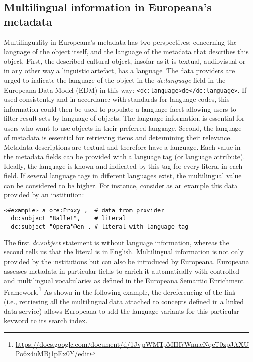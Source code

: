 \subsection{Multilingual information in Europeana's metadata}
\label{sec:multilingualinfo}

Multilinguality in Europeana's metadata has two perspectives: concerning the language of the object itself, and the language of the metadata that describes this object. First, the described cultural object, insofar as it is textual, audiovisual or in any other way a linguistic artefact, has a language. The data providers are urged to indicate the language of the object in the \textit{dc:language} field in the Europeana Data Model (EDM) in this way: \texttt{<dc:language>de</dc:language>}. If used consistently and in accordance with standards for language codes, this information could then be used to populate a language facet allowing users to filter result-sets by language of objects. The language information is essential for users who want to use objects in their preferred language. 
Second, the language of metadata is essential for retrieving items and determining their relevance. Metadata descriptions are textual and therefore have a language. Each value in the metadata fields can be provided with a language tag (or language attribute). Ideally, the language is known and indicated by this tag for every literal in each field. If several language tags in different languages exist, the multilingual value can be considered to be higher. For instance, consider as an example this data provided by an institution:

\begingroup
   \fontsize{8pt}{10pt}\selectfont
\begin{verbatim}
<#example> a ore:Proxy ;  # data from provider
  dc:subject "Ballet",    # literal
  dc:subject "Opera"@en . # literal with language tag
\end{verbatim}
\endgroup

The first \textit{dc:subject} statement is without language information, whereas the second tells us that the literal is in English. Multilingual information is not only provided by the institutions but can also be introduced by Europeana.
Europeana assesses metadata in particular fields to enrich it automatically with controlled and multilingual vocabularies as defined in the Europeana Semantic Enrichment Framework.\footnote{\url{https://docs.google.com/document/d/1JvjrWMTpMIH7WnuieNqcT0zpJAXUPo6x4uMBj1pEx0Y/edit}} As shown in the following example, the dereferencing of the link (i.e., retrieving all the multilingual data attached to concepts defined in a linked data service) allows Europeana to add the language variants for this particular keyword to its search index.

